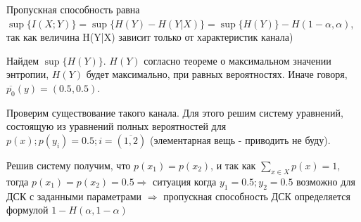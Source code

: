 \documentclass[../main.tex]{subfiles}
\begin{document}
Пропускная способность равна $\sup{\{I(X;Y)\}} = \sup\{H(Y)-H(Y|X)\} = \sup\{H(Y)\} - H(1-\alpha, \alpha)$, так как величина H(Y|X) зависит только от характеристик канала)

Найдем $\sup\{H(Y)\}$. $H(Y)$ согласно теореме о максимальном значении энтропии, $H(Y)$ будет максимально, при равных вероятностях. Иначе говоря, $\overline{p_{0}}(y)=(0.5,0.5)$. 

Проверим существование такого канала. Для этого решим систему уравнений, состоящую из уравнений полных вероятностей для $p(x); p(y_i) =0.5; i=(\overline{1,2})$ (элементарная вещь - приводить не буду). 

Решив систему получим, что $p(x_1)=p(x_2)$, и так как $\sum\limits_{x \in X}p(x)=1$, тогда $p(x_1)=p(x_2)=0.5 \Rightarrow$ ситуация когда $y_1=0.5; y_2=0.5$ возможно для ДСК с заданными параметрами $\Rightarrow$ пропускная способность ДСК определяется формулой $1-H(\alpha, 1-\alpha)$
\end{document}
